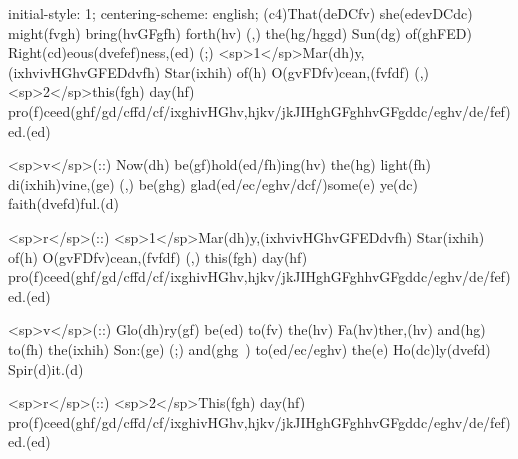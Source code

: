 initial-style: 1;
centering-scheme: english;
(c4)That(deDCfv) she(edevDCdc) might(fvgh) bring(hvGFgfh) forth(hv) (,) the(hg/hggd) Sun(dg) of(ghFED) Right(cd)eous(dvefef)ness,(ed) (;) <sp>1</sp>Mar(dh)y,(ixhvivHGhvGFEDdvfh) Star(ixhih) of(h) O(gvFDfv)cean,(fvfdf) (,) <sp>2</sp>this(fgh) day(hf) pro(f)ceed(ghf/gd/cffd/cf/ixghivHGhv,hjkv/jkJIHghGFghhvGFgddc/eghv/de/fef)ed.(ed)

<sp>v</sp>(::) Now(dh) be(gf)hold(ed/fh)ing(hv) the(hg) light(fh) di(ixhih)vine,(ge) (,) be(ghg) glad(ed/ec/eghv/dcf/)some(e) ye(dc) faith(dvefd)ful.(d)

<sp>r</sp>(::) <sp>1</sp>Mar(dh)y,(ixhvivHGhvGFEDdvfh) Star(ixhih) of(h) O(gvFDfv)cean,(fvfdf) (,) this(fgh) day(hf) pro(f)ceed(ghf/gd/cffd/cf/ixghivHGhv,hjkv/jkJIHghGFghhvGFgddc/eghv/de/fef)ed.(ed)


<sp>v</sp>(::) Glo(dh)ry(gf) be(ed) to(fv) the(hv) Fa(hv)ther,(hv) and(hg) to(fh) the(ixhih) Son:(ge) (;) and(ghg~) to(ed/ec/eghv) the(e) Ho(dc)ly(dvefd) Spir(d)it.(d)

<sp>r</sp>(::) <sp>2</sp>This(fgh) day(hf) pro(f)ceed(ghf/gd/cffd/cf/ixghivHGhv,hjkv/jkJIHghGFghhvGFgddc/eghv/de/fef)ed.(ed)